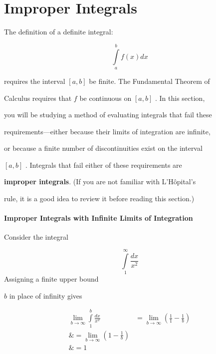 \section{Improper Integrals}
\label{sec:improper-integrals}

The definition of a definite integral:



$$\int\limits _a^b f(x)dx$$



requires the interval $[a,b]$ be finite. The Fundamental Theorem of

Calculus requires that $f$ be continuous on $[a,b]$ . In this section,

you will be studying a method of evaluating integrals that fail these

requirements---either because their limits of integration are infinite,

or because a finite number of discontinuities exist on the interval

$[a,b]$ . Integrals that fail either of these requirements are

\textbf{improper integrals}. (If you are not familiar with L'Hôpital's

rule, it is a good idea to review it before reading this section.)



\paragraph{Improper Integrals with Infinite Limits of Integration}



Consider the integral



$$\int\limits _1^\infty\frac{dx}{x^2}$$ Assigning a finite upper bound

$b$ in place of infinity gives



\begin{align}
\lim _{b\to\infty}\int\limits _1^b\frac{dx}{x^2} 

&= \lim _{b\to\infty}\left(\frac{1}{1} - \frac{1}{b}\right) \\\&= \lim _{b\to\infty}\left(1 - \frac{1}{b}\right) \\\&= 1
\end{align}



